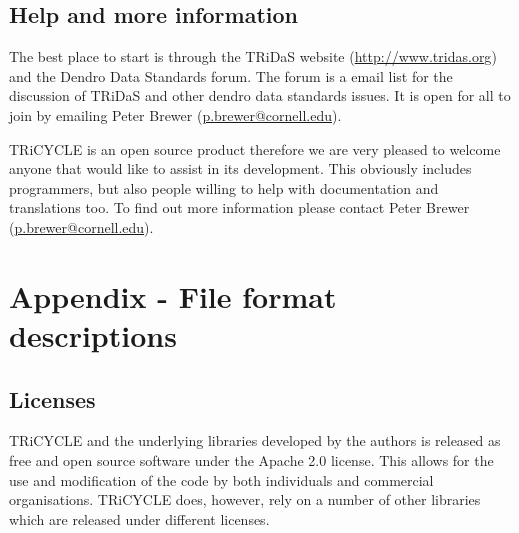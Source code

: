 \documentclass[10pt, headsepline,DIV14,BCOR0.5cm]{scrreprt}
\begin{document}
\chapter{Help and more information}

The best place to start is through the TRiDaS website (\url{http://www.tridas.org}) and the
Dendro Data Standards forum. The forum is a email list for the discussion of TRiDaS and other dendro
data standards issues. It is open for all to join by emailing Peter Brewer (\href{mailto:p.brewer@cornell.edu}{p.brewer@cornell.edu}).

TRiCYCLE is an open source product therefore we are very pleased to welcome anyone that would
like to assist in its development. This obviously includes programmers, but also people willing to help
with documentation and translations too. To find out more information please contact Peter Brewer
(\href{mailto:p.brewer@cornell.edu}{p.brewer@cornell.edu}).






\part*{Appendix - File format descriptions}

\appendix



\chapter{Licenses}

TRiCYCLE and the underlying libraries developed by the authors is released as free and open source software under the Apache 2.0 license.  This allows for the use and modification of the code by both individuals and commercial organisations.  TRiCYCLE does, however, rely on a number of other libraries which are released under different licenses.
\end{document}
